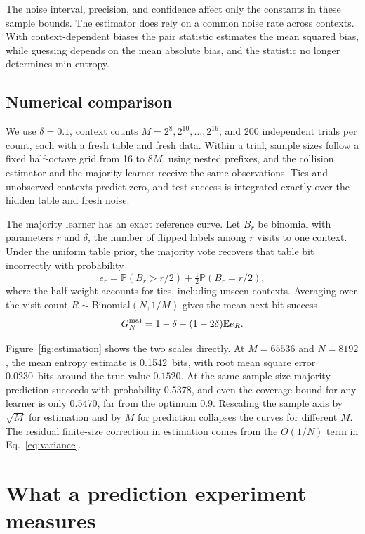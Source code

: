 \documentclass[11pt,a4paper]{article}
\newcommand{\E}{\mathbb{E}}
\newcommand{\PP}{\mathbb{P}}
\newcommand{\ExampleContexts}{65536}
\newcommand{\ExampleSamples}{8192}
\newcommand{\ExampleEstimate}{0.1542}
\newcommand{\ExampleRMSE}{0.0230}
\newcommand{\ExamplePrediction}{0.5378}
\newcommand{\ExampleCoverage}{0.5470}
\begin{document}
The noise interval, precision, and confidence affect only the constants in these sample bounds. The estimator does rely on a common noise rate across contexts. With context-dependent biases the pair statistic estimates the mean squared bias, while guessing depends on the mean absolute bias, and the statistic no longer determines min-entropy.

\subsection{Numerical comparison}

We use \(\delta=0.1\), context counts \(M=2^8,2^{10},\ldots,2^{16}\), and 200 independent trials per count, each with a fresh table and fresh data. Within a trial, sample sizes follow a fixed half-octave grid from 16 to \(8M\), using nested prefixes, and the collision estimator and the majority learner receive the same observations. Ties and unobserved contexts predict zero, and test success is integrated exactly over the hidden table and fresh noise.

The majority learner has an exact reference curve. Let \(B_r\) be binomial with parameters \(r\) and \(\delta\), the number of flipped labels among \(r\) visits to one context. Under the uniform table prior, the majority vote recovers that table bit incorrectly with probability
\[
e_r=\PP(B_r>r/2)+\tfrac12\PP(B_r=r/2),
\]
where the half weight accounts for ties, including unseen contexts. Averaging over the visit count \(R\sim\mathrm{Binomial}(N,1/M)\) gives the mean next-bit success
\begin{equation}
G_N^{\rm maj}=1-\delta-(1-2\delta)\E e_R.
\label{eq:majority}
\end{equation}

Figure~\ref{fig:estimation} shows the two scales directly. At \(M=\ExampleContexts\) and \(N=\ExampleSamples\), the mean entropy estimate is \ExampleEstimate\ bits, with root mean square error \ExampleRMSE\ bits around the true value \(0.1520\). At the same sample size majority prediction succeeds with probability \ExamplePrediction, and even the coverage bound for any learner is only \ExampleCoverage, far from the optimum \(0.9\). Rescaling the sample axis by \(\sqrt M\) for estimation and by \(M\) for prediction collapses the curves for different \(M\). The residual finite-size correction in estimation comes from the \(O(1/N)\) term in Eq.~\eqref{eq:variance}.

\section{What a prediction experiment measures}
\label{sec:conclusion}
\end{document}
